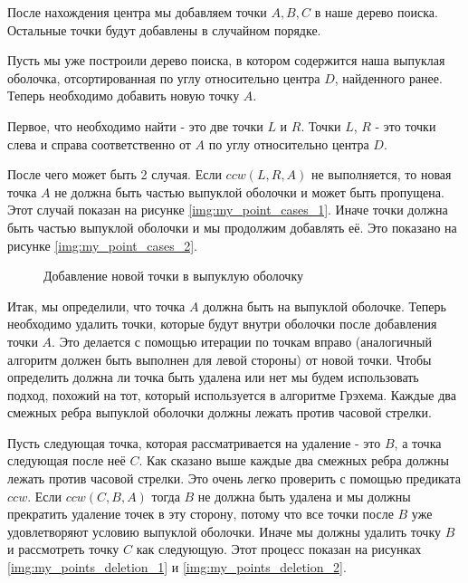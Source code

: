 После нахождения центра мы добавляем точки $A, B, C$ в наше дерево поиска. Остальные точки будут добавлены в случайном порядке.

Пусть мы уже построили дерево поиска, в котором содержится наша выпуклая оболочка, отсортированная по углу относительно центра $D$, найденного ранее. Теперь необходимо добавить новую точку $A$.

Первое, что необходимо найти - это две точки $L$ и $R$. Точки $L$, $R$ - это точки слева и справа соответственно от $A$ по углу относительно центра $D$.


После чего может быть 2 случая. Если $ccw(L, R, A)$ не выполняется, то новая точка $A$ не должна быть частью выпуклой оболочки и может быть пропущена. Этот случай показан на рисунке \ref{img:my_point_cases_1}. Иначе точки должна быть частью выпуклой оболочки и мы продолжим добавлять её. Это показано на рисунке \ref{img:my_point_cases_2}.

\begin{figure}[H]
	{\centering
		\hfill
		\hfill
		\hfill
	}
	\caption{Добавление новой точки в выпуклую оболочку}
	\label{img:my_point_cases}
\end{figure}

Итак, мы определили, что точка $A$ должна быть на выпуклой оболочке. Теперь необходимо удалить точки, которые будут внутри оболочки после добавления точки $A$. Это делается с помощью итерации по точкам вправо (аналогичный алгоритм должен быть выполнен для левой стороны) от новой точки. Чтобы определить должна ли точка быть удалена или нет мы будем использовать подход, похожий на тот, который используется в алгоритме Грэхема. Каждые два смежных ребра выпуклой оболочки должны лежать против часовой стрелки.

Пусть следующая точка, которая рассматривается на удаление - это $B$, а точка следующая после неё $C$. Как сказано выше каждые два смежных ребра должны лежать против часовой стрелки. Это очень легко проверить с помощью предиката $ccw$. Если $ccw(C, B, A)$ тогда $B$ не должна быть удалена и мы должны прекратить удаление точек в эту сторону, потому что все точки после $B$ уже удовлетворяют условию выпуклой оболочки. Иначе мы должны удалить точку $B$ и рассмотреть точку $C$ как следующую. Этот процесс показан на рисунках \ref{img:my_points_deletion_1} и \ref{img:my_points_deletion_2}.

